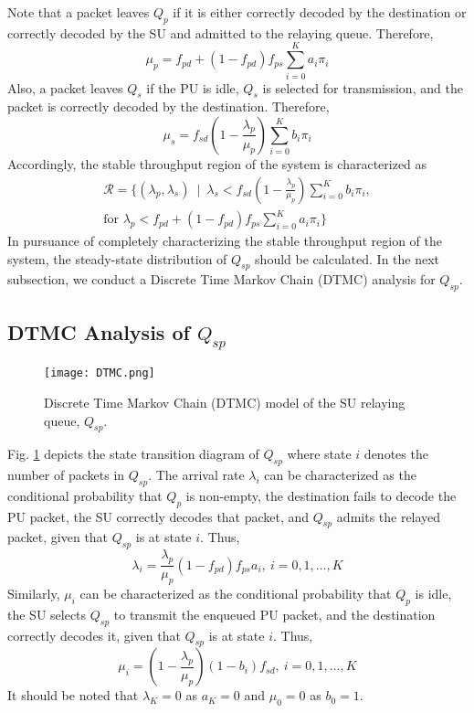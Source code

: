 \documentclass[conference]{IEEEtran}
\begin{document}
Note that a packet leaves $Q_p$ if it is either correctly decoded
by the destination or correctly decoded by the SU and 
admitted to the relaying queue. Therefore,
\begin{equation} \label{eq:mu_p}
\displaystyle \mu_p = f_{pd} + \left(1-f_{pd}\right) f_{ps}
\sum_{i=0}^K a_i\pi_i
\end{equation}
Also, a packet leaves $Q_s$ if the PU is idle, $Q_s$ is selected
for transmission, and the packet is correctly decoded by the
destination. Therefore,
\begin{equation} \label{eq:mu_s}
\displaystyle \mu_s = f_{sd} \left( 1 - \frac{\lambda_p}{\mu_p}
\right) \displaystyle\sum_{i=0}^K b_i\pi_i
\end{equation}
Accordingly, the stable throughput region of the system is characterized
as
\begin{multline} \label{eq:region}
\mathcal{R} = \biggl\{ (\lambda_p, \lambda_s) \enspace \Big| \enspace
\displaystyle\lambda_s < f_{sd} \left( 1 - \frac{\lambda_p}{\mu_p} \right) \displaystyle\sum_{i=0}^K b_i\pi_i,\\
\!\!\!\! \text{for } \displaystyle \lambda_p < f_{pd} + \left(1-f_{pd}\right)
f_{ps} \sum_{i=0}^K a_i\pi_i\biggr\}
\end{multline}
In pursuance of completely characterizing the stable throughput
region of the system, the steady-state distribution of $Q_{sp}$
should be calculated. In the next subsection, we conduct a
Discrete Time Markov Chain (DTMC) analysis for $Q_{sp}$.

\subsection{DTMC Analysis of $ Q_{sp}$ }
\begin{figure}
\centering
\texttt{[image: DTMC.png]}
\caption{Discrete Time Markov Chain (DTMC) model of the SU relaying queue, $Q_{sp}$.}
\label{fig:DTMC}
\end{figure}

Fig. \ref{fig:DTMC} depicts the state transition diagram of $Q_{sp}$ where
state $i$ denotes the number of packets in $Q_{sp}$. The
arrival rate $\lambda_i$ can be characterized as the conditional
probability that $Q_p$ is non-empty, the destination fails to
decode the PU packet, the SU correctly decodes that packet, and
$Q_{sp}$ admits the relayed packet, given that $Q_{sp}$ is at
state $i$. Thus,
\begin{equation} \label{lambda_i}
\displaystyle\lambda_i = \frac{\lambda_p}{\mu_p}
\left(1-f_{pd}\right) f_{ps} a_i, \: i = 0, 1,\ldots,K
\end{equation}
Similarly, $\mu_i$ can be characterized as the conditional
probability that $Q_p$ is idle, the SU selects $Q_{sp}$ to transmit
the enqueued PU packet, and the destination correctly decodes it, given that
$Q_{sp}$ is at state $i$. Thus,
\begin{equation} \label{mu_i}
\displaystyle\mu_i = \left(1-\frac{\lambda_p}{\mu_p}\right) 
\left(1-b_i\right) f_{sd}, \: i = 0, 1,\ldots,K
\end{equation}
It should be noted that $\lambda_K=0$ as $a_K=0$ and $\mu_0=0$ as
$b_0=1$.
\end{document}
